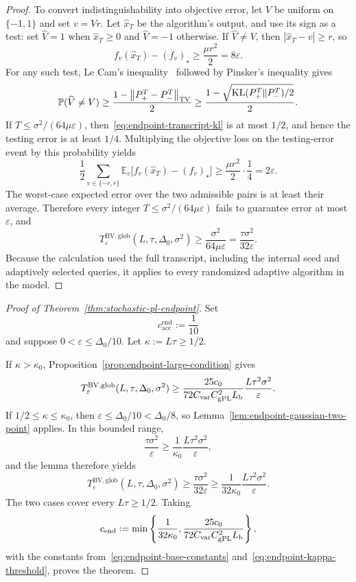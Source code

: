 \documentclass[11pt]{article}
\newcommand{\E}{\mathbb{E}}
\newcommand{\Pbb}{\mathbb{P}}
\newcommand{\norm}[1]{\left\lVert #1\right\rVert}
\newcommand{\abs}[1]{\left\lvert #1\right\rvert}
\begin{document}
\begin{proof}
To convert indistinguishability into objective error, let $V$ be uniform on $\{-1,1\}$ and set $v=Vr$. Let
$\widehat x_T$ be the algorithm's output, and use its sign as a test: set $\widehat V=1$ when
$\widehat x_T\ge0$ and $\widehat V=-1$ otherwise. If $\widehat V\ne V$, then
$\abs{\widehat x_T-v}\ge r$, so
\[
f_v(\widehat x_T)-(f_v)_\star
\ge
\frac{\mu r^2}{2}
=8\varepsilon.
\]
For any such test, Le Cam's inequality~\citep{Yu1997} followed by Pinsker's inequality gives
\[
\Pbb(\widehat V\ne V)
\ge
\frac{1-\norm{P_+^T-P_-^T}_{\rm TV}}{2}
\ge
\frac{1-\sqrt{\mathrm{KL}(P_+^T\Vert P_-^T)/2}}{2}.
\]
If $T\le\sigma^2/(64\mu\varepsilon)$, then~\eqref{eq:endpoint-transcript-kl} is at most $1/2$, and hence the testing
error is at least $1/4$. Multiplying the objective loss on the testing-error event by this probability yields
\[
\frac12\sum_{v\in\{-r,r\}}
\E_v\bigl[f_v(\widehat x_T)-(f_v)_\star\bigr]
\ge
\frac{\mu r^2}{2}\cdot\frac14
=
2\varepsilon.
\]
The worst-case expected error over the two admissible pairs is at least their average. Therefore every integer
$T\le\sigma^2/(64\mu\varepsilon)$ fails to guarantee error at most $\varepsilon$, and
\begingroup
\[
T_\varepsilon^{\mathrm{BV,glob}}(L,\tau,\Delta_0,\sigma^2)
\ge
\frac{\sigma^2}{64\mu\varepsilon}
=
\frac{\tau\sigma^2}{32\varepsilon}.
\]
\endgroup
Because the calculation used the full transcript, including the internal seed and adaptively selected queries, it
applies to every randomized adaptive algorithm in the model.
\end{proof}


\begingroup
\begin{proof}[Proof of Theorem~\ref{thm:stochastic-pl-endpoint}]
Set
\[
c_{\mathrm{acc}}^{\mathrm{end}}:=\frac1{10}
\]
and suppose $0<\varepsilon\le\Delta_0/10$. Let $\kappa:=L\tau\ge1/2$.

If $\kappa>\kappa_0$, Proposition~\ref{prop:endpoint-large-condition} gives
\[
T_\varepsilon^{\mathrm{BV,glob}}(L,\tau,\Delta_0,\sigma^2)
\ge
\frac{25c_0}{72C_{\rm var}C_{\mathrm{gPL}}^2L_{\rm b}}
\frac{L\tau^2\sigma^2}{\varepsilon}.
\]
If $1/2\le\kappa\le\kappa_0$, then $\varepsilon\le\Delta_0/10<\Delta_0/8$, so
Lemma~\ref{lem:endpoint-gaussian-two-point} applies. In this bounded range,
\[
\frac{\tau\sigma^2}{\varepsilon}
\ge
\frac{1}{\kappa_0}
\frac{L\tau^2\sigma^2}{\varepsilon},
\]
and the lemma therefore yields
\[
T_\varepsilon^{\mathrm{BV,glob}}(L,\tau,\Delta_0,\sigma^2)
\ge
\frac{\tau\sigma^2}{32\varepsilon}
\ge
\frac{1}{32\kappa_0}
\frac{L\tau^2\sigma^2}{\varepsilon}.
\]
The two cases cover every $L\tau\ge1/2$. Taking
\[
c_{\mathrm{end}}
:=
\min\left\{
\frac{1}{32\kappa_0},
\frac{25c_0}{72C_{\rm var}C_{\mathrm{gPL}}^2L_{\rm b}}
\right\},
\]
with the constants from~\eqref{eq:endpoint-base-constants} and~\eqref{eq:endpoint-kappa-threshold}, proves the
theorem.
\end{proof}
\endgroup
\end{document}
